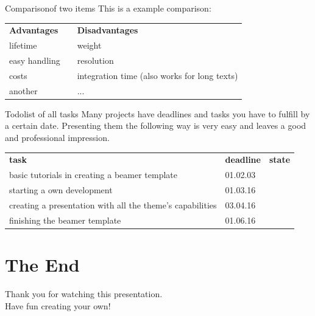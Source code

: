 \documentclass[	12pt, 				
				t,					
				aspectratio=169]{beamer}
\begin{document}
	\begin{frame}{Comparison}{of two items}
		This is a example comparison:
		\begin{center}
		\begin{tabularx}{\textwidth}{XcX}
			\textbf{Advantages} & & \textbf{Disadvantages}\\
			lifetime & \drawopp & weight \\
			easy handling & \drawopp & resolution \\
			costs & \drawopp & integration time (also works for long texts)\\
			another & \drawopp & ... \\
		\end{tabularx}
		\end{center}
	\end{frame} 
	
	
	\begin{frame}{Todo}{list of all tasks}
		Many projects have deadlines and tasks you have to fulfill by a certain date.
		Presenting them the following way is very easy and leaves a good and professional impression.
		\vfill
		\begin{tabularx}{\textwidth}{Xll}
			\textbf{task} & \textbf{deadline} & \textbf{state}\\
			basic tutorials in creating a beamer template & 01.02.03 & \myCheck \\
			starting a own development & 01.03.16 & \myCheck \\
			creating a presentation with all the theme's capabilities & 03.04.16 & \myCheck \\
			finishing the beamer template & 01.06.16 & \myUnCheck\\
		\end{tabularx}
		\vfill
	\end{frame}
	
		
	\section*{The End}
	\begin{frame}
		\vspace{2.2cm}
		\begin{center}
			\huge Thank you for watching this presentation.\\
			Have fun creating your own!
		\end{center}
		\vfill
	\end{frame}
	
\end{document}

